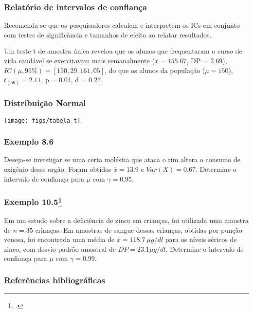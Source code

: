 \documentclass[11pt]{beamer}
\begin{document}
\begin{frame}
\frametitle{Relatório de intervalos de confiança}

Recomenda se que os pesquisadores calculem e interpretem os ICs em conjunto com testes de significância e tamanhos de efeito ao relatar resultados. 

Um teste t de amostra única revelou que os alunos que frequentaram o curso de vida saudável se exercitavam mais semanalmente (\(\bar{x} = 155.67\), DP = 2.69), \(IC(\mu, 95\%)= [150,29, 161,05]\), do que os alunos da população ($\mu = 150$), $t_{(59)} = 2.11$, p = 0.04, d = 0.27.

\end{frame}

\begin{frame}
\frametitle{Distribuição Normal}

\begin{center}\texttt{[image: figs/tabela\_t]} \end{center}
\end{frame}


\begin{frame}
\frametitle{Exemplo 8.6}
Deseja-se investigar se uma certa moléstia que ataca o rim altera o consumo de oxigênio desse orgão. Foram obtidos \(\bar{x}=13.9\) e \(Var(X)=0.67\). Determine o intervalo de confiança para \(\mu\) com \(\gamma=0.95\).
\vspace{1in}
\vspace{1in}

\end{frame}

\begin{frame}
\frametitle{Exemplo 10.5\footcite{martinez2015bioestatistica}}
Em um estudo sobre a deficiência de zinco em crianças, foi utilizada uma amostra de \(n=35\) crianças. Em amostras de sangue dessas crianças, obtidas por punção venosa, foi encontrada uma média de \(\bar{x}=118.7\ \mu g/dl\) para os níveis séricos de zinco, com desvio padrão amostral de \(DP=23.1 \mu g/dl\). Determine o intervalo de confiança para \(\mu\) com \(\gamma=0.99\).
\vspace{1in}
\vspace{1in}

\end{frame}


\begin{frame}
\frametitle{Referências bibliográficas}
\printbibliography
\end{frame}
\end{document}
